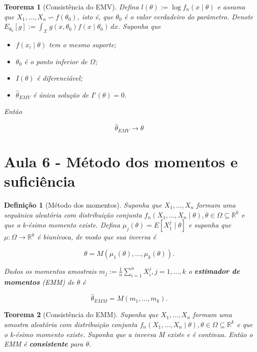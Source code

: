 \documentclass{article}
\newtheorem{theorem}{Teorema}
\newtheorem{definition}{Definição}
\begin{document}
\begin{theorem}[Consistência do EMV]
Defina $l(\theta) := \log f_n(x \mid \theta)$ e assuma que $X_1, \ldots, X_n \backsim f(\theta_0)$, isto é, que $\theta_0$ é o valor verdadeiro do parâmetro.
Denote $E_{\theta_0}[g] := \int_{\mathcal{X}} g(x, \theta_0) f(x \mid \theta_0)\, dx$. Suponha que

\begin{itemize}
    \item $f(x_i \mid \theta)$ tem o mesmo suporte;
    \item $\theta_0$ é o ponto inferior de $\Omega$;
    \item $I(\theta)$ é diferenciável;
    \item $\hat{\theta}_{EMV}$ é única solução de $I'(\theta) = 0$.
\end{itemize}

Então

$$\hat{\theta}_{EMV} \rightarrow \theta$$

\end{theorem}

\section*{Aula 6 - Método dos momentos e suficiência}

\begin{definition}[Método dos momentos]
Suponha que $X_1, \ldots, X_n$ formam uma sequânica aleatória com distribuição conjunta $f_n (X_1, \ldots, X_n \mid \theta), \theta \in \Omega \subseteq \mathbb{R}^k$ e que o k-ésimo momento existe. Defina $\mu_j (\theta) = E[X_1^j \mid \theta]$ e suponha que $\mu: \Omega \rightarrow \mathbb{R}^k$ é biunívoca, de modo que sua inversa é

$$\theta = M(\mu_1(\theta), \ldots, \mu_k(\theta)).$$

Dados os momentos amostrais $m_j := \frac{1}{n} \sum_{i=1}^n X_i^j, j = 1, \ldots, k$ o \textbf{estimador de momentos} (EMM) de $\theta$ é

$$\hat{\theta}_{EMM} = M(m_1, \ldots, m_k).$$
\end{definition}

\begin{theorem}[Consistência do EMM]
Suponha que $X_1, \ldots, X_n$ formam uma amostra aleatória com distribuição conjunta  $f_n (X_1, \ldots, X_n \mid \theta), \theta \in \Omega \subseteq \mathbb{R}^k$ e que o k-ésimo momento existe. Suponha que a inversa M existe e é continua. Então o EMM é \textbf{consistente} para $\theta$.
\end{theorem}
\end{document}
